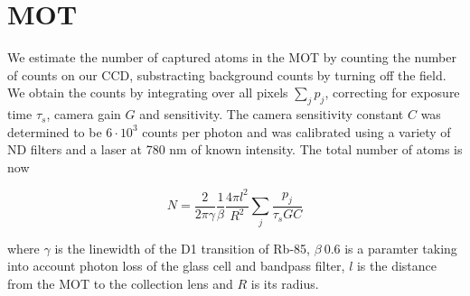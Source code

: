  
 \section{MOT}
 
We estimate the number of captured atoms in the MOT by counting the number of counts on our CCD, substracting background counts by turning off the field. We obtain the counts by integrating over all pixels $\sum_j p_j$, correcting for exposure time $\tau_s$, camera gain $G$ and sensitivity. The camera sensitivity constant $C$ was determined to be $6 \cdot 10^3$ counts per photon and was calibrated using a variety of ND filters and a laser at 780 nm of known intensity. The total number of atoms is now
 
 \begin{equation}
     N = \frac{2}{2\pi\gamma} \frac{1}{\beta} \frac{4\pi l^2}{R^2} \sum_j \frac{p_j}{\tau_s G C}
 \end{equation}
 
 where $\gamma$ is the linewidth of the D1 transition of Rb-85, $\beta ~0.6$ is a paramter taking into account photon loss of the glass cell and bandpass filter, $l$ is the distance from the MOT to the collection lens and $R$ is its radius. 
